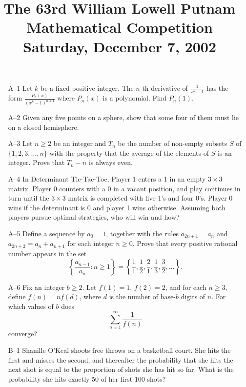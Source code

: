 \documentclass[amssymb,twocolumn,pra,10pt,aps]{revtex4-1}
\begin{document}
\title{The 63rd William Lowell Putnam Mathematical Competition \\
    Saturday, December 7, 2002}
\maketitle

\begin{itemize}
\item[A--1]
Let $k$ be a fixed positive integer. The $n$-th derivative of
$\frac{1}{x^k - 1}$ has the form $\frac{P_n(x)}{(x^k - 1)^{n+1}}$
where $P_n(x)$ is a polynomial. Find $P_n(1)$.

\item[A--2]
Given any five points on a sphere, show that some four of them
must lie on a closed hemisphere.

\item[A--3]
Let $n \geq 2$ be an integer and $T_n$ be the number of non-empty
subsets $S$ of $\{1, 2, 3, \dots, n\}$ with the property that the
average of the elements of $S$ is an integer. Prove that
$T_n - n$ is always even.

\item[A--4]
In Determinant Tic-Tac-Toe, Player 1 enters a 1 in an empty
$3 \times 3$ matrix. Player 0 counters with a 0 in a vacant position,
and play continues in turn until the $3 \times 3$ matrix is
completed with five 1's and four 0's. Player 0 wins if the
determinant is 0 and player 1 wins otherwise. Assuming both
players pursue optimal strategies, who will win and how?

\item[A--5]
Define a sequence by $a_0=1$, together with the rules
$a_{2n+1} = a_n$ and $a_{2n+2} = a_n + a_{n+1}$ for each
integer $n \geq 0$. Prove that every positive rational number
appears in the set
\[
\left\{ \frac{a_{n-1}}{a_n}: n \geq 1 \right\} =
\left\{ \frac{1}{1}, \frac{1}{2}, \frac{2}{1}, \frac{1}{3},
\frac{3}{2}, \dots \right\}.
\]

\item[A--6]
Fix an integer $b \geq 2$. Let $f(1) = 1$, $f(2) = 2$, and for each
$n \geq 3$, define $f(n) = n f(d)$, where $d$ is the number of
base-$b$ digits of $n$. For which values of $b$ does
\[
\sum_{n=1}^\infty \frac{1}{f(n)}
\]
converge?

\item[B--1]
Shanille O'Keal shoots free throws on a basketball court. She hits
the first and misses the second, and thereafter the probability that
she hits the next shot is equal to the proportion of shots she
has hit so far. What is the probability she hits exactly 50 of
her first 100 shots?


\end{itemize}
\end{document}
